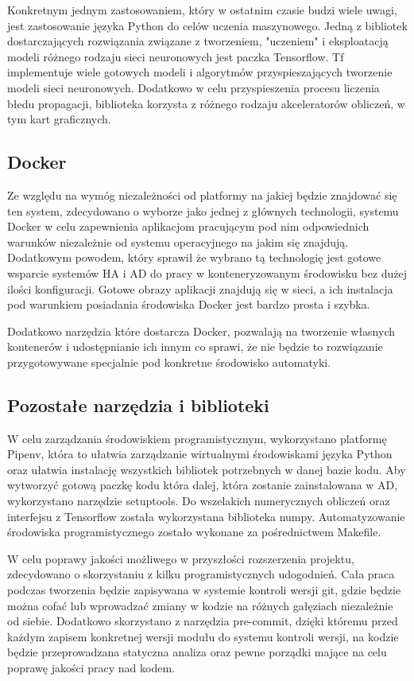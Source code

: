 Konkretnym jednym zastosowaniem, który w ostatnim czasie budzi wiele uwagi, jest zastosowanie języka Python do celów uczenia maszynowego. Jedną z bibliotek dostarczających rozwiązania związane z tworzeniem, "uczeniem" i eksploatacją modeli różnego rodzaju sieci neuronowych jest paczka Tensorflow. Tf implementuje wiele gotowych modeli i algorytmów przyspieszających tworzenie modeli sieci neuronowych. Dodatkowo w celu przyspieszenia procesu liczenia błedu propagacji, biblioteka korzysta z różnego rodzaju akceleratorów obliczeń, w tym kart graficznych.

\subsection{Docker}
Ze względu na wymóg niezależności od platformy na jakiej będzie znajdować się ten system, zdecydowano o wyborze jako jednej z głównych technologii, systemu Docker w celu zapewnienia aplikacjom pracującym pod nim odpowiednich warunków niezależnie od systemu operacyjnego na jakim się znajdują. Dodatkowym powodem, który sprawił że wybrano tą technologię jest gotowe wsparcie systemów HA i AD do pracy w konteneryzowanym środowisku bez dużej ilości konfiguracji. Gotowe obrazy aplikacji znajdują się w sieci, a ich instalacja pod warunkiem posiadania środowiska Docker jest bardzo prosta i szybka.

Dodatkowo narzędzia które dostarcza Docker, pozwalają na tworzenie własnych kontenerów i udostępnianie ich innym co sprawi, że nie będzie to rozwiązanie przygotowywane specjalnie pod konkretne środowisko automatyki.

\subsection{Pozostałe narzędzia i biblioteki}
W celu zarządzania środowiskiem programistycznym, wykorzystano platformę Pipenv, która to ułatwia zarządzanie wirtualnymi środowiskami języka Python oraz ułatwia instalację wszystkich bibliotek potrzebnych w danej bazie kodu. Aby wytworzyć gotową paczkę kodu która dalej, która zostanie zainstalowana w AD, wykorzystano narzędzie setuptools. Do wszelakich numerycznych obliczeń oraz interfejsu z Tensorflow została wykorzystana biblioteka numpy. Automatyzowanie środowiska programistycznego zostało wykonane za pośrednictwem Makefile. 

W celu poprawy jakości możliwego w przyszłości rozszerzenia projektu, zdecydowano o skorzystaniu z kilku programistycznych udogodnień. Cała praca podczas tworzenia będzie zapisywana w systemie kontroli wersji git, gdzie będzie można cofać lub wprowadzać zmiany w kodzie na różnych gałęziach niezależnie od siebie. Dodatkowo skorzystano z narzędzia pre-commit, dzięki któremu przed każdym zapisem konkretnej wersji modułu do systemu kontroli wersji, na kodzie będzie przeprowadzana statyczna analiza oraz pewne porządki mające na celu poprawę jakości pracy nad kodem.


